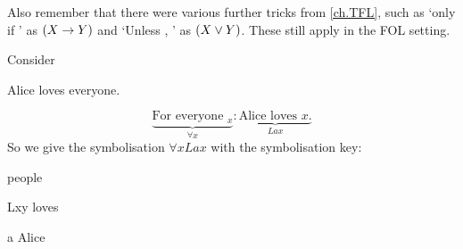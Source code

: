 Also remember that there were various further tricks from \ref{ch.TFL}, such as `\metaX only if \metaY' as $(X\rightarrow Y)$ and `Unless \metaX, \metaY' as $(X\vee Y)$. These still apply in the FOL setting. 


Consider 	
\begin{earg}
	\item[\ex{loves everyone}] Alice loves everyone.
\end{earg}
\begin{equation*}
\underbrace{\text{For everyone $_x$}}_{\forall x}: \underbrace{\text{Alice loves $x$.}}_{Lax}
\end{equation*}
So we give the symbolisation $\forall x Lax$ with the symbolisation key:
\begin{ekey}
\item[\text{domain}] people
\item[Lxy] loves 
\item[a] Alice
\end{ekey}


